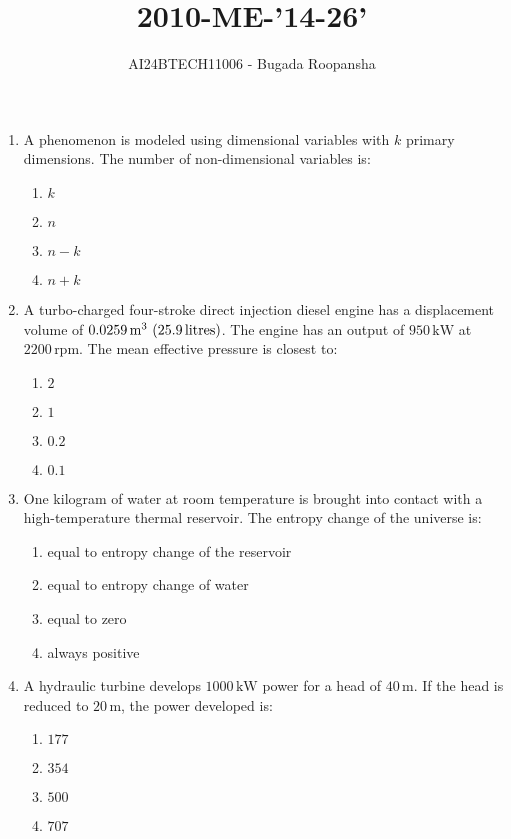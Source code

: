 \documentclass[journal,12pt,twocolumn]{IEEEtran}
\theoremstyle{remark}
\begin{document}

\vspace{3cm}
\title{2010-ME-'14-26'}
\author{AI24BTECH11006 - Bugada Roopansha}
\maketitle

\begin{enumerate}[start=14]
  
    \item A phenomenon is modeled using dimensional variables with $k$ primary dimensions. The number of non-dimensional variables is:
    \begin{enumerate}
        \item $k$
        \item $n$
        \item $n - k$
        \item $n + k$
    \end{enumerate}

    \item A turbo-charged four-stroke direct injection diesel engine has a displacement volume of $0.0259 \, \text{m}^3 \, \left(25.9 \, \text{litres}\right)$. The engine has an output of $950 \, \text{kW}$ at $2200 \, \text{rpm}$. The mean effective pressure  is closest to:
    \begin{enumerate}
        \item $2$
        \item $1$
        \item $0.2$
        \item $0.1$
    \end{enumerate}

    \item One kilogram of water at room temperature is brought into contact with a high-temperature thermal reservoir. The entropy change of the universe is:
    \begin{enumerate}
        \item equal to entropy change of the reservoir
        \item equal to entropy change of water
        \item equal to zero
        \item always positive
    \end{enumerate}

    \item A hydraulic turbine develops $1000 \, \text{kW}$ power for a head of $40 \, \text{m}$. If the head is reduced to $20 \, \text{m}$, the power developed  is:
    \begin{enumerate}
        \item $177$
        \item $354$
        \item $500$
        \item $707$
    \end{enumerate}


\end{enumerate}
\end{document}
